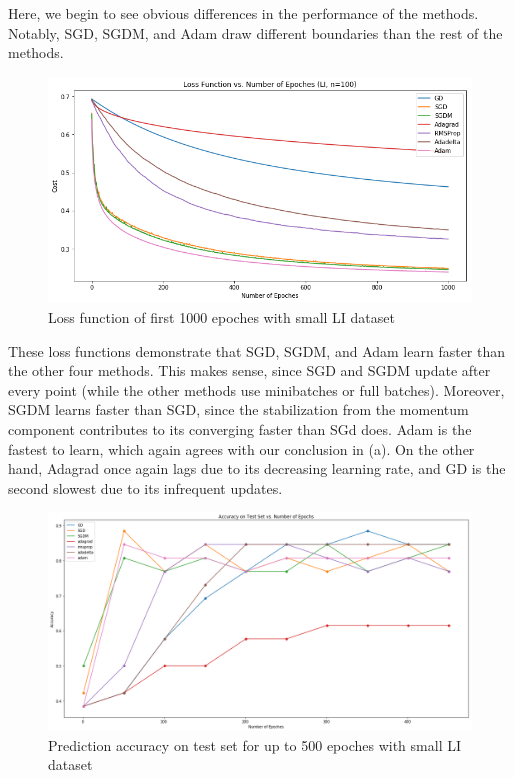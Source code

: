 \documentclass[twoside,11pt]{homework}
\begin{document}
Here, we begin to see obvious differences in the performance of the methods. Notably, SGD, SGDM, and Adam draw different boundaries than the rest of the methods.

	\begin{figure}[H]
		\centering
		\includegraphics[scale=.5]{q5/insep_100/loss.png}	
		\caption{Loss function of first 1000 epoches with small LI dataset}
	\end{figure}
	
	These loss functions demonstrate that SGD, SGDM, and Adam learn faster than the other four methods. This makes sense, since SGD and SGDM update after every point (while the other methods use minibatches or full batches). Moreover, SGDM learns faster than SGD, since the stabilization from the momentum component contributes to its converging faster than SGd does. Adam is the fastest to learn, which again agrees with our conclusion in (a). On the other hand, Adagrad once again lags due to its decreasing learning rate, and GD is the second slowest due to its infrequent updates.

\begin{figure}[H]
		\centering
		\includegraphics[scale=.3]{q5/insep_100/acc.png}	
		\caption{Prediction accuracy on test set for up to 500 epoches with small LI dataset}
	\end{figure}
\end{document}

